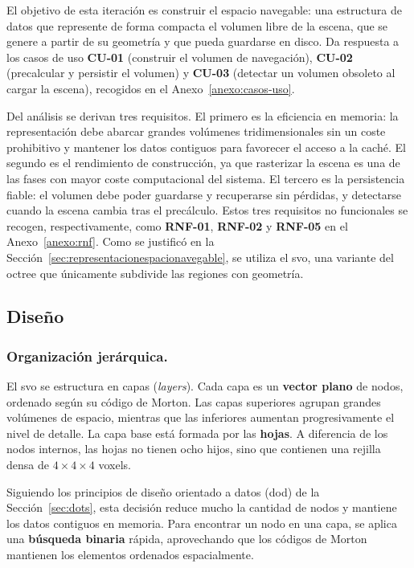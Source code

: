 El objetivo de esta iteración es construir el espacio navegable: una estructura de datos que represente de forma compacta el volumen libre de la escena, que se genere a partir de su geometría y que pueda guardarse en disco.
Da respuesta a los casos de uso \textbf{CU-01} (construir el volumen de navegación), \textbf{CU-02} (precalcular y persistir el volumen) y \textbf{CU-03} (detectar un volumen obsoleto al cargar la escena), recogidos en el Anexo~\ref{anexo:casos-uso}.

Del análisis se derivan tres requisitos.
El primero es la eficiencia en memoria: la representación debe abarcar grandes volúmenes tridimensionales sin un coste prohibitivo y mantener los datos contiguos para favorecer el acceso a la caché.
El segundo es el rendimiento de construcción, ya que rasterizar la escena es una de las fases con mayor coste computacional del sistema.
El tercero es la persistencia fiable: el volumen debe poder guardarse y recuperarse sin pérdidas, y detectarse cuando la escena cambia tras el precálculo.
Estos tres requisitos no funcionales se recogen, respectivamente, como \textbf{RNF-01}, \textbf{RNF-02} y \textbf{RNF-05} en el Anexo~\ref{anexo:rnf}.
Como se justificó en la Sección~\ref{sec:representacionespacionavegable}, se utiliza el \acrshort{svo}, una variante del \gls{octree} que únicamente subdivide las regiones con geometría.

\subsection{Diseño}

\subsubsection{Organización jerárquica.}
El \acrshort{svo} se estructura en capas (\textit{layers}).
Cada capa es un \textbf{vector plano} de nodos, ordenado según su código de Morton.
Las capas superiores agrupan grandes volúmenes de espacio, mientras que las inferiores aumentan progresivamente el nivel de detalle.
La capa base está formada por las \textbf{hojas}.
A diferencia de los nodos internos, las hojas no tienen ocho hijos, sino que contienen una rejilla densa de $4\times4\times4$ \glspl{voxel}.

Siguiendo los principios de diseño orientado a datos (\acrshort{dod}) de la Sección~\ref{sec:dots}, esta decisión reduce mucho la cantidad de nodos y mantiene los datos contiguos en memoria.
Para encontrar un nodo en una capa, se aplica una \textbf{búsqueda binaria} rápida, aprovechando que los códigos de Morton mantienen los elementos ordenados espacialmente.

